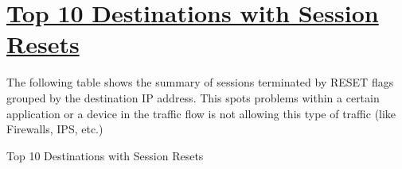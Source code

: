 %
%
%

\chapter[Top 10 Destinations with Session Resets]{\underline{Top 10 Destinations with Session Resets}}
\begin{flushleft}
The following table shows the summary of sessions terminated by RESET flags grouped by the destination IP address. This spots problems within a certain application or a device in the traffic flow is not allowing this type of traffic (like Firewalls, IPS, etc.)
\end{flushleft}
\begin{table}[H]
  \begin{center}
    \caption[\normalsize{Top 10 Destinations with Session Resets}]{\small{Top 10 Destinations with Session Resets}}
  \end{center}
\end{table}
